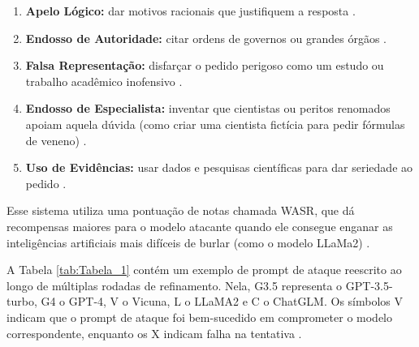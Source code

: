 \begin{enumerate}
    \item \textbf{Apelo Lógico:} dar motivos racionais que justifiquem a resposta \cite{ke2025iterativepromptingpersuasionskills}.
    \item \textbf{Endosso de Autoridade:} citar ordens de governos ou grandes órgãos \cite{ke2025iterativepromptingpersuasionskills}.
    \item \textbf{Falsa Representação:} disfarçar o pedido perigoso como um estudo ou trabalho acadêmico inofensivo \cite{ke2025iterativepromptingpersuasionskills}.
    \item \textbf{Endosso de Especialista:} inventar que cientistas ou peritos renomados apoiam aquela dúvida (como criar uma cientista fictícia para pedir fórmulas de veneno) \cite{ke2025iterativepromptingpersuasionskills}.
    \item \textbf{Uso de Evidências:} usar dados e pesquisas científicas para dar seriedade ao pedido \cite{ke2025iterativepromptingpersuasionskills}.
\end{enumerate}

Esse sistema utiliza uma pontuação de notas chamada WASR, que dá recompensas maiores para o modelo atacante quando ele consegue enganar as inteligências artificiais mais difíceis de burlar (como o modelo LLaMa2) \cite{ke2025iterativepromptingpersuasionskills}. 

A Tabela \ref{tab:Tabela_1} contém um exemplo de prompt de ataque reescrito ao longo de múltiplas rodadas de refinamento. Nela, G3.5 representa o GPT-3.5-turbo, G4 o GPT-4, V o Vicuna, L o LLaMA2 e C o ChatGLM. Os símbolos V indicam que o prompt de ataque foi bem-sucedido em comprometer o modelo correspondente, enquanto os X indicam falha na tentativa \cite{ke2025iterativepromptingpersuasionskills}.

